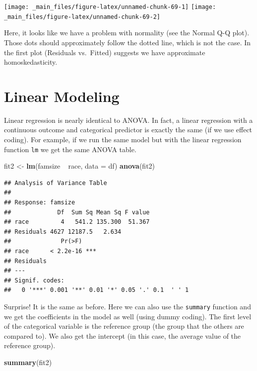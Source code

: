 \documentclass[]{tufte-book}
\newenvironment{Shaded}{}{}
\newcommand{\KeywordTok}[1]{\textcolor[rgb]{0.00,0.44,0.13}{\textbf{#1}}}
\newcommand{\DataTypeTok}[1]{\textcolor[rgb]{0.56,0.13,0.00}{#1}}
\newcommand{\StringTok}[1]{\textcolor[rgb]{0.25,0.44,0.63}{#1}}
\newcommand{\OperatorTok}[1]{\textcolor[rgb]{0.40,0.40,0.40}{#1}}
\newcommand{\NormalTok}[1]{#1}
\theoremstyle{definition}
\theoremstyle{definition}
\theoremstyle{remark}
\begin{document}
\texttt{[image: \_main\_files/figure-latex/unnamed-chunk-69-1]}
\texttt{[image: \_main\_files/figure-latex/unnamed-chunk-69-2]}

Here, it looks like we have a problem with normality (see the Normal Q-Q
plot). Those dots should approximately follow the dotted line, which is
not the case. In the first plot (Residuals vs.~Fitted) suggests we have
approximate homoskedasticity.

\section*{Linear Modeling}\label{linear-modeling}

Linear regression is nearly identical to ANOVA. In fact, a linear
regression with a continuous outcome and categorical predictor is
exactly the same (if we use effect coding). For example, if we run the
same model but with the linear regression function \texttt{lm} we get
the same ANOVA table.

\begin{Shaded}
\begin{Highlighting}[]
\NormalTok{fit2 <-}\StringTok{ }\KeywordTok{lm}\NormalTok{(famsize }\OperatorTok{~}\StringTok{ }\NormalTok{race, }\DataTypeTok{data =}\NormalTok{ df)}
\KeywordTok{anova}\NormalTok{(fit2)}
\end{Highlighting}
\end{Shaded}

\begin{verbatim}
## Analysis of Variance Table
## 
## Response: famsize
##             Df  Sum Sq Mean Sq F value
## race         4   541.2 135.300  51.367
## Residuals 4627 12187.5   2.634        
##              Pr(>F)    
## race      < 2.2e-16 ***
## Residuals              
## ---
## Signif. codes:  
##   0 '***' 0.001 '**' 0.01 '*' 0.05 '.' 0.1  ' ' 1
\end{verbatim}

Surprise! It is the same as before. Here we can also use the
\texttt{summary} function and we get the coefficients in the model as
well (using dummy coding). The first level of the categorical variable
is the reference group (the group that the others are compared to). We
also get the intercept (in this case, the average value of the reference
group).

\begin{Shaded}
\begin{Highlighting}[]
\KeywordTok{summary}\NormalTok{(fit2)}
\end{Highlighting}
\end{Shaded}
\end{document}
